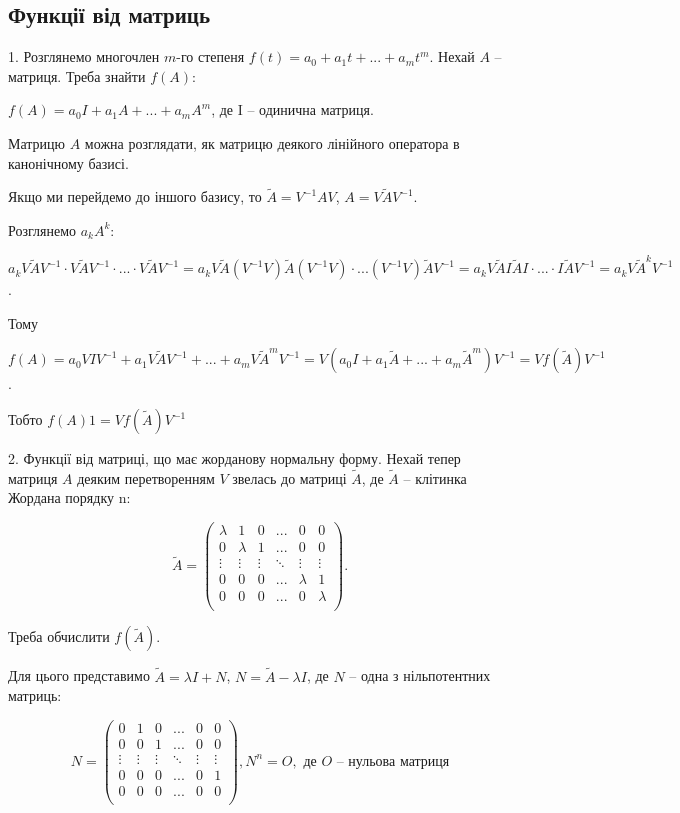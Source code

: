 \subsection{Функції від матриць}

1. Розглянемо многочлен $m$-го степеня $f(t) = a_0 + a_1 t + ... + a_m t^m$.
Нехай $A$ -- матриця. Треба знайти $f(A)$:

$f(A) = a_0 I + a_1 A + ... + a_m A^m$, де I -- одинична матриця.

Матрицю $A$ можна розглядати, як матрицю деякого лінійного оператора в
канонічному базисі.

Якщо ми перейдемо до іншого базису, то $\tilde{A} = V^{-1} A V$, $A = V \tilde{A} V^{-1}$.

Розглянемо $a_k A^k$:

$a_k V \tilde{A} V^{-1} \cdot V \tilde{A} V^{-1} \cdot ... \cdot V \tilde{A} V^{-1}
=a_k V \tilde{A} (V^{-1} V) \tilde{A} (V^{-1}V) \cdot ... (V^{-1}V) \tilde{A} V^{-1}
= a_k V \tilde{A}I\tilde{A}I \cdot ... \cdot I\tilde{A}V^{-1}
= a_k V \tilde{A}^k V^{-1}$.

Тому 

$f(A) = a_0 V I V^{-1} + a_1 V \tilde{A} V^{-1} + ... + a_m V \tilde{A}^m V^{-1}
= V(a_0 I + a_1 \tilde{A} + ... + a_m \tilde{A}^m) V^{-1}
= Vf(\tilde{A})V^{-1}$.

Тобто $f(A)1 = Vf(\tilde{A})V^{-1}$

2. Функції від матриці, що має жорданову нормальну форму.
Нехай тепер матриця $A$ деяким перетворенням $V$ звелась до матриці $\tilde{A}$, де
$\tilde{A}$ -- клітинка Жордана порядку n:

$$\tilde{A} = \begin{pmatrix}
	\lambda & 1 & 0 & ... & 0 & 0 \\
	0 & \lambda & 1 & ... & 0 & 0 \\
	\vdots & \vdots & \vdots & \ddots & \vdots & \vdots \\
	0 & 0 & 0 & ... & \lambda & 1 \\
	0 & 0 & 0 & ... & 0 & \lambda \\
\end{pmatrix}. $$

Треба обчислити $f(\tilde{A})$.

Для цього представимо $\tilde{A} = \lambda I + N$, $N = \tilde{A} - \lambda I$, де $N$ -- одна з
нільпотентних матриць:

$$N = \begin{pmatrix}
	0 & 1 & 0 & ... & 0 & 0 \\
	0 & 0 & 1 & ... & 0 & 0 \\
	\vdots & \vdots & \vdots & \ddots & \vdots & \vdots \\
	0 & 0 & 0 & ... & 0 & 1 \\
	0 & 0 & 0 & ... & 0 & 0 \\
\end{pmatrix}, N^n = O, \text{ де } O \text{ -- нульова матриця}$$

